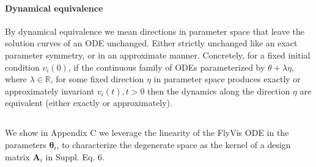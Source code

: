\documentclass[11pt]{article}
\begin{document}
\paragraph{Dynamical equivalence}
By dynamical equivalence we mean directions in parameter space that leave the solution curves of an ODE unchanged. Either strictly unchanged like an exact parameter symmetry, or in an approximate manner. Concretely, for a fixed initial condition $v_i(0)$, if the continuous family of ODEs parameterized by $\theta + \lambda \eta$, where $\lambda \in \mathbb{R}$, for some fixed direction $\eta$ in parameter space produces exactly or approximately invariant $v_i(t), t > 0$ then the dynamics along the direction $\eta$ are equivalent (either exactly or approximately).

\subsection{}

We show in Appendix C we leverage the linearity of the FlyVis ODE in the parameters $\mathbf{\theta}_i$, to characterize the degenerate space as the kernel of a design matrix $\mathbf{A}_i$ in Suppl. Eq. 6.

\end{document}
